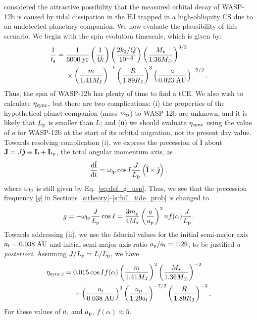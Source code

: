 \documentclass[
        fleqn,
        usenatbib,
        referee
    ]{mnras}
\newcommand*{\rd}[2]{\frac{\mathrm{d}#1}{\mathrm{d}#2}}
\newcommand*{\abs}[1]{\left|#1\right|}
\newcommand*{\p}[1]{\left(#1\right)}
\newcommand*{\bm}[1]{\mathbf{#1}}
\newcommand*{\uv}[1]{\hat{\boldsymbol{\mathbf{#1}}}}
\begin{document}
\citet{millholland2019obliquity} considered the attractive possibility that the
measured orbital decay of WASP-12b is caused by tidal dissipation in the HJ
trapped in a high-obliquity CS due to an undetected planetary companion. We now
evaluate the plausibility of this scenario. We begin with the spin evolution
timescale, which is given by:
\begin{align}
    \frac{1}{t_{\rm s}} ={}& \frac{1}{6000\;\mathrm{yr}}
            \p{\frac{1}{4k}}
            \p{\frac{2k_2/Q}{10^{-6}}}
            \p{\frac{M_\star}{1.36 M_{\odot}}}^{3/2}\nonumber\\
        &\times \p{\frac{m}{1.41 M_{\rm J}}}^{-1}
            \p{\frac{R}{1.89 R_{\rm J}}}^{3}
            \p{\frac{a}{0.023\;\mathrm{AU}}}^{-9/2}.
\end{align}
Thus, the spin of WASP-12b has plenty of time to find a tCE\@. We also wish to
calculate $\eta_{\rm sync}$, but there are two complications: (i) the
properties of the hypothetical planet companion (mass $m_{\rm p}$) to WASP-12b
are unknown, and it is likely that $L_{\rm p}$ is smaller than $L$; and (ii) we
should evaluate $\eta_{\rm sync}$ using the value of $a$ for WASP-12b at the
start of its orbital migration, not its present day value. Towards resolving
complication (i), we express the precession of $\uv{l}$ about $\bm{J} =
J\uv{\jmath} \equiv \bm{L} + \bm{L}_{\rm p}$, the total angular momentum axis,
as
\begin{equation}
    \rd{\uv{l}}{t} = \omega_{\rm lp}\cos I \frac{J}{L_{\rm p}}
        \p{\uv{l} \times \uv{\jmath}},
        \label{eq:wasp12b_g}
\end{equation}
where $\omega_{\rm lp}$ is still given by Eq.~\eqref{eq:def_g_usp}. Thus, we see
that the precession frequency $\abs{g}$ in
Sections~\ref{s:theory}--\ref{s:full_tide_prob} is changed to
\begin{equation}
    g = -\omega_{\rm lp}\frac{J}{L_{\rm p}} \cos I
        = \frac{3m_{\rm p}}{4M_{\star}}
        \p{\frac{a}{a_{\rm p}}}^3 n f(\alpha) \frac{J}{L_{\rm p}}\label{eq:hj_g}.
\end{equation}
Towards addressing (ii), we use the fiducial values for the initial semi-major
axis $a_{\rm i} = 0.038\;\mathrm{AU}$ and initial semi-major axis ratio $a_{\rm
p} / a_{\rm i} = 1.29$, to be justified \emph{a posteriori}. Assuming $J /
L_{\rm p} \simeq L / L_{\rm p}$, we have
\begin{align}
    \eta_{\rm sync, i} ={}& 0.015 \cos I f(\alpha)
            \p{\frac{m}{1.41M_J}}^2
            \p{\frac{M_\star}{1.36M_{\odot}}}^{-2}
            \nonumber\\
        &\times
            \p{\frac{a_{\rm i}}{0.038\;\mathrm{AU}}}^{3}
            \p{\frac{a_{\rm p}}{1.29 a_{\rm i}}}^{-7/2}
            \p{\frac{R}{1.89R_{\rm J}}}^{-3}.\label{eq:hj_etasync}
\end{align}
For these values of $a_{\rm i}$ and $a_{\rm p}$, $f(\alpha) \approx 5$.
\end{document}
